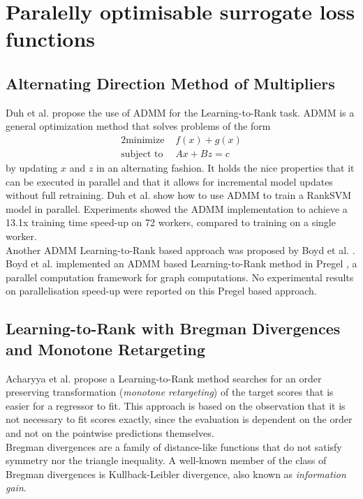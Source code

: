 \section{Paralelly optimisable surrogate loss functions}
\subsection{Alternating Direction Method of Multipliers}
Duh et al. \cite{Duh2011} propose the use of \ac{ADMM} for the Learning-to-Rank task. \ac{ADMM} is a general optimization method that solves problems of the form
\begin{alignat*}{2}
\text{minimize }   &  f(x) + g(x) \\
\text{subject to } &  Ax + Bz = c
\end{alignat*}
by updating $x$ and $z$ in an alternating fashion. It holds the nice properties that it can be executed in parallel and that it allows for incremental model updates without full retraining. Duh et al. \cite{Duh2011} show how to use \ac{ADMM} to train a RankSVM model in parallel. Experiments showed the \ac{ADMM} implementation to achieve a 13.1x training time speed-up on 72 workers, compared to training on a single worker.\\

Another \ac{ADMM} Learning-to-Rank based approach was proposed by Boyd et al. \cite{Boyd2012}. Boyd et al. \cite{Boyd2012} implemented an \ac{ADMM} based Learning-to-Rank method in Pregel \cite{Malewicz2010}, a parallel computation framework for graph computations. No experimental results on parallelisation speed-up were reported on this Pregel based approach.
\subsection{Learning-to-Rank with Bregman Divergences and Monotone Retargeting}
Acharyya et al. \cite{Acharyya2012} propose a Learning-to-Rank method searches for an order preserving transformation (\emph{monotone retargeting}) of the target scores that is easier for a regressor to fit. This approach is based on the observation that it is not necessary to fit scores exactly, since the evaluation is dependent on the order and not on the pointwise predictions themselves.\\

Bregman divergences are a family of distance-like functions that do not satisfy symmetry nor the triangle inequality. A well-known member of the class of Bregman divergences is Kullback-Leibler divergence, also known as \emph{information gain}.\\

